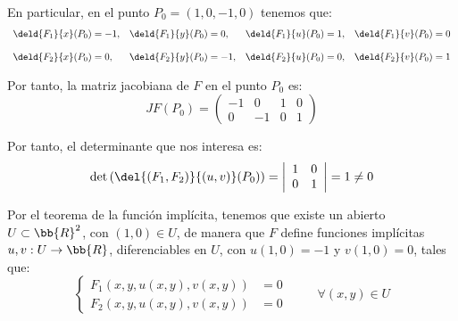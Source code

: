 \begin{ejercicio}
    En particular, en el punto $P_0=(1,0,-1,0)$ tenemos que:
    \begin{equation*}
        \begin{array}{llll}
            \deld{F_1}{x}(P_0) = -1,& \deld{F_1}{y}(P_0) = 0,& \deld{F_1}{u}(P_0) = 1,& \deld{F_1}{v}(P_0) = 0 \\ \\
            \deld{F_2}{x}(P_0) = 0,& \deld{F_2}{y}(P_0) = -1,& \deld{F_2}{u}(P_0) = 0,& \deld{F_2}{v}(P_0) = 1
        \end{array}
    \end{equation*}

    Por tanto, la matriz jacobiana de $F$ en el punto $P_0$ es:
    \begin{equation*}
        JF(P_0) =
        \begin{pmatrix}
            -1 & 0 & 1 & 0 \\
            0 & -1 & 0 & 1
        \end{pmatrix}
    \end{equation*}

    Por tanto, el determinante que nos interesa es:
    \begin{equation*}
        \det \left( \del{(F_1,F_2)}{(u,v)}(P_0) \right) =
        \left|
            \begin{array}{cc}
                1 & 0 \\
                0 & 1
            \end{array}
        \right| = 1 \neq 0
    \end{equation*}

    Por el teorema de la función implícita, tenemos que existe un abierto $U\subset \bb{R}^2$,
    con $(1,0)\in U$, de manera que $F$ define funciones implícitas $u,v:U\to \bb{R}$, diferenciables en $U$,
    con $u(1,0)=-1$ y $v(1,0)=0$, tales que:
    \begin{equation}\label{eq:funciones_implicitas}
        \left\{
            \begin{array}{ll}
                F_1(x,y,u(x,y),v(x,y)) &= 0 \\
                F_2(x,y,u(x,y),v(x,y)) &= 0
            \end{array}
        \right. \hspace{1cm} \forall (x,y)\in U
    \end{equation}


\end{ejercicio}
